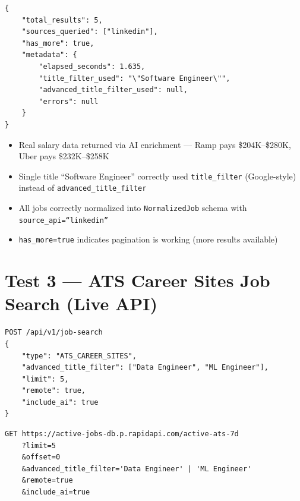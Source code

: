 \documentclass[11pt, a4paper]{article}
\begin{document}
\begin{lstlisting}[style=apistyle, title=\color{codetext}Response Metadata]
{
    "total_results": 5,
    "sources_queried": ["linkedin"],
    "has_more": true,
    "metadata": {
        "elapsed_seconds": 1.635,
        "title_filter_used": "\"Software Engineer\"",
        "advanced_title_filter_used": null,
        "errors": null
    }
}
\end{lstlisting}

\begin{successbox}
\begin{itemize}[leftmargin=1.5em, itemsep=2pt]
    \item Real salary data returned via AI enrichment --- Ramp pays \$204K--\$280K, Uber pays \$232K--\$258K
    \item Single title ``Software Engineer'' correctly used \texttt{title\_filter} (Google-style) instead of \texttt{advanced\_title\_filter}
    \item All jobs correctly normalized into \texttt{NormalizedJob} schema with \texttt{source\_api=``linkedin''}
    \item \texttt{has\_more=true} indicates pagination is working (more results available)
\end{itemize}
\end{successbox}

\newpage
\section{Test 3 --- ATS Career Sites Job Search (Live API)}

\begin{lstlisting}[style=apistyle, title=\color{codetext}Request]
POST /api/v1/job-search
{
    "type": "ATS_CAREER_SITES",
    "advanced_title_filter": ["Data Engineer", "ML Engineer"],
    "limit": 5,
    "remote": true,
    "include_ai": true
}
\end{lstlisting}

\begin{lstlisting}[style=apistyle, title=\color{codetext}Query Sent to RapidAPI]
GET https://active-jobs-db.p.rapidapi.com/active-ats-7d
    ?limit=5
    &offset=0
    &advanced_title_filter='Data Engineer' | 'ML Engineer'
    &remote=true
    &include_ai=true
\end{lstlisting}
\end{document}
